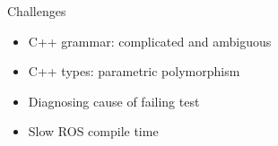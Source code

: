 \documentclass[final]{beamer}
\newlength{\onecolwid}
\begin{document}
\begin{frame}[t]
\begin{columns}[t]
\begin{column}{\onecolwid}
\begin{block}{Challenges}
\begin{itemize}
\item C++ grammar: complicated and ambiguous
\item C++ types: parametric polymorphism
\item Diagnosing cause of failing test
\item Slow ROS compile time %
\end{itemize}

\end{block}




%
%



\end{column} %

\end{columns} %

\end{frame} %
\end{document}
